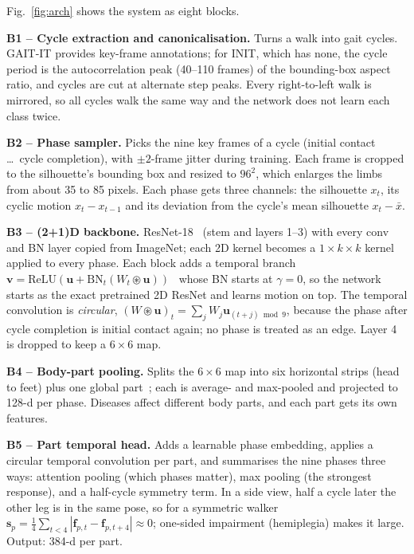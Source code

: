\documentclass[conference]{IEEEtran}
\begin{document}
Fig.~\ref{fig:arch} shows the system as eight blocks.

\textbf{B1 -- Cycle extraction and canonicalisation.} Turns a walk into gait
cycles. GAIT-IT provides key-frame annotations; for INIT, which has none, the
cycle period is the autocorrelation peak (40--110 frames) of the bounding-box
aspect ratio, and cycles are cut at alternate step peaks. Every right-to-left
walk is mirrored, so all cycles walk the same way and the network does not
learn each class twice.

\textbf{B2 -- Phase sampler.} Picks the nine key frames of a cycle (initial
contact \dots\ cycle completion), with $\pm2$-frame jitter during training.
Each frame is cropped to the silhouette's bounding box and resized to $96^2$,
which enlarges the limbs from about 35 to 85 pixels. Each phase gets three
channels: the silhouette $x_t$, its cyclic motion $x_t-x_{t-1}$ and its
deviation from the cycle's mean silhouette $x_t-\bar x$.

\textbf{B3 -- (2+1)D backbone.} ResNet-18~\cite{he2016resnet} (stem and
layers 1--3) with every conv and BN layer copied from ImageNet; each 2D kernel
becomes a $1{\times}k{\times}k$ kernel applied to every phase. Each block adds a
temporal branch $\mathbf{v}=\mathrm{ReLU}(\mathbf{u}+\mathrm{BN}_t(W_t\circledast
\mathbf{u}))$~\cite{tran2018r21d} whose BN starts at $\gamma=0$, so the network
starts as the exact pretrained 2D ResNet and learns motion on top. The temporal
convolution is \emph{circular}, $(W\circledast\mathbf{u})_t=\sum_j
W_j\mathbf{u}_{(t+j)\bmod 9}$, because the phase after cycle completion is
initial contact again; no phase is treated as an edge. Layer 4 is dropped to
keep a $6\times6$ map.

\textbf{B4 -- Body-part pooling.} Splits the $6\times6$ map into six horizontal
strips (head to feet) plus one global part~\cite{chao2019gaitset}; each is
average- and max-pooled and projected to 128-d per phase. Diseases affect
different body parts, and each part gets its own features.

\textbf{B5 -- Part temporal head.} Adds a learnable phase embedding, applies a
circular temporal convolution per part, and summarises the nine phases three
ways: attention pooling (which phases matter), max pooling (the strongest
response), and a half-cycle symmetry term. In a side view, half a cycle later
the other leg is in the same pose, so for a symmetric walker
$\mathbf{s}_p=\frac14\sum_{t<4}|\mathbf{f}_{p,t}-\mathbf{f}_{p,t+4}|\approx0$;
one-sided impairment (hemiplegia) makes it large. Output: 384-d per part.
\end{document}
